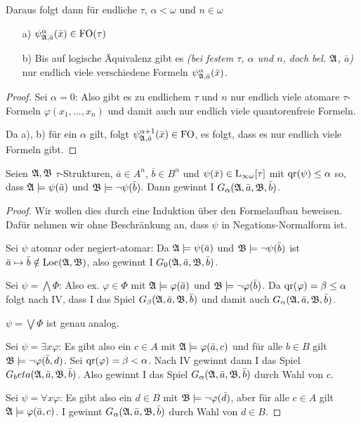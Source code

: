 Daraus folgt dann für endliche $\tau$, $\alpha < \omega$ und $n\in \omega$
\begin{itemize}
	\item[a)] $\psi^\alpha_{\mathfrak{A},\bar{a}}(\bar{x})\in \operatorname{FO}(\tau)$
	\item[b)] Bis auf logische Äquivalenz gibt es \textit{(bei festem $\tau$, $\alpha$ und $n$, doch bel. $\mathfrak{A}$, $\bar{a}$)} nur endlich viele verschiedene Formeln $\psi^\alpha_{\mathfrak{A},\bar{a}}(\bar{x})$.
\end{itemize}
\begin{proof}
	Sei $\alpha=0$: Also gibt es zu endlichem $\tau$ und $n$ nur endlich viele atomare $\tau$-Formeln $\varphi(x_1,\dots,x_n)$ und damit auch nur endlich viele quantorenfreie Formeln.
	
	Da a), b) für ein $\alpha$ gilt, folgt $\psi^{\alpha+1}_{\mathfrak{A},\bar{a}}(\bar{x})\in \operatorname{FO}$, es folgt, dass es nur endlich viele Formeln gibt.
\end{proof}

\begin{lemma}
	Seien $\mathfrak{A},\mathfrak{B}$ $\tau$-Strukturen, $\bar{a}\in A^n$, $\bar{b}\in B^n$ und $\psi(\bar{x})\in \operatorname{L}_{\infty\omega}[\tau]$ mit $\operatorname{qr}(\psi)\leq \alpha$ so, dass $\mathfrak{A}\models \psi(\bar{a})$ und $\mathfrak{B}\models \neg\psi(\bar{b})$. Dann gewinnt I $G_\alpha(\mathfrak{A},\bar{a},\mathfrak{B},\bar{b})$. 
\end{lemma}
\begin{proof}
	Wir wollen dies durch eine Induktion über den Formelaufbau beweisen. Dafür nehmen wir ohne Beschränkung an, dass $\psi$ in Negations-Normalform ist.
	
	Sei $\psi$ atomar oder negiert-atomar: Da $\mathfrak{A}\models \psi(\bar{a})$ und $\mathfrak{B}\models \neg\psi(\bar{b})$ ist $\bar{a}\mapsto\bar{b}\notin \operatorname{Loc}(\mathfrak{A},\mathfrak{B})$, also gewinnt I $G_0(\mathfrak{A},\bar{a},\mathfrak{B},\bar{b})$.
	
	Sei $\psi=\bigwedge \Phi$: Also ex. $\varphi\in \Phi$ mit $\mathfrak{A}\models\varphi(\bar{a})$ und $\mathfrak{B}\models\neg\varphi(\bar{b})$. Da $\operatorname{qr}(\varphi)=\beta \leq \alpha$ folgt nach IV, dass I das Spiel $G_\beta(\mathfrak{A},\bar{a},\mathfrak{B},\bar{b})$ und damit auch $G_\alpha(\mathfrak{A},\bar{a},\mathfrak{B},\bar{b})$.
	
	$\psi=\bigvee\Phi$ ist genau analog.
	
	Sei $\psi=\exists x \varphi$: Es gibt also ein $c\in A$ mit $\mathfrak{A}\models \varphi(\bar{a},c)$ und für alle $b\in B$ gilt $\mathfrak{B}\models \neg\varphi(\bar{b},d)$. Sei $\operatorname{qr}(\varphi)=\beta<\alpha$. Nach IV gewinnt dann I das Spiel $G_beta(\mathfrak{A},\bar{a},\mathfrak{B},\bar{b})$. Also gewinnt I das Spiel $G_\alpha(\mathfrak{A},\bar{a},\mathfrak{B},\bar{b})$ durch Wahl von $c$.
	
	Sei $\psi=\forall x \varphi$: Es gibt also ein $d\in B$ mit $\mathfrak{B}\models \neg\varphi(\bar{d})$, aber für alle $c\in A$ gilt $\mathfrak{A}\models \varphi(\bar{a},c)$. I gewinnt $G_\alpha(\mathfrak{A},\bar{a},\mathfrak{B},\bar{b})$ durch Wahl von $d\in B$.
\end{proof}

